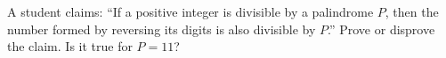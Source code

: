 A student claims: ``If a positive integer is divisible by a palindrome $P$, then the number formed by reversing its digits is also divisible by $P$.'' Prove or disprove the claim. Is it true for $P=11$?
